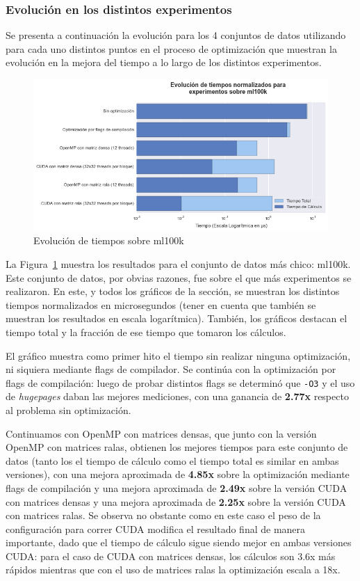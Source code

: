 \documentclass[11pt, a4paper]{article}
\begin{document}
  \subsubsection{Evolución en los distintos experimentos}

  Se presenta a continuación la evolución para los 4 conjuntos de datos
  utilizando para cada uno distintos puntos en el proceso de optimización que
  muestran la evolución en la mejora del tiempo a lo largo de los distintos
  experimentos.

  \begin{figure}[ht]
      \centering
      \includegraphics[width=\textwidth]{plots/ml100k.png}
      \caption{Evolución de tiempos sobre ml100k}\label{fig:ml100k}
  \end{figure}

  La Figura~\ref{fig:ml100k} muestra los resultados para el conjunto de datos
  más chico: ml100k. Este conjunto de datos, por obvias razones, fue sobre el
  que más experimentos se realizaron. En este, y todos los gráficos de la
  sección, se muestran los distintos tiempos normalizados en microsegundos
  (tener en cuenta que también se muestran los resultados en escala
  logarítmica). También, los gráficos destacan el tiempo total y la fracción
  de ese tiempo que tomaron los cálculos.

  El gráfico muestra como primer hito el tiempo sin realizar ninguna
  optimización, ni siquiera mediante flags de compilador. Se continúa con la
  optimización por flags de compilación: luego de probar distintos flags se
  determinó que \texttt{-O3} y el uso de {\em hugepages} daban las mejores
  mediciones, con una ganancia de {\bf 2.77x} respecto al problema sin
  optimización.

  Continuamos con OpenMP con matrices densas, que junto con la versión OpenMP
  con matrices ralas, obtienen los mejores tiempos para este conjunto de datos
  (tanto los el tiempo de cálculo como el tiempo total es similar en ambas
  versiones), con una mejora aproximada de {\bf 4.85x} sobre la optimización
  mediante flags de compilación y una mejora aproximada de {\bf 2.49x} sobre la
  versión CUDA con matrices densas y una mejora aproximada de {\bf 2.25x} sobre
  la versión CUDA con matrices ralas. Se observa no obstante como en este caso
  el peso de la configuración para correr CUDA modifica el resultado final de
  manera importante, dado que el tiempo de cálculo sigue siendo mejor en ambas
  versiones CUDA: para el caso de CUDA con matrices densas, los cálculos son
  3.6x más rápidos mientras que con el uso de matrices ralas la optimización
  escala a 18x.
 
\end{document}
